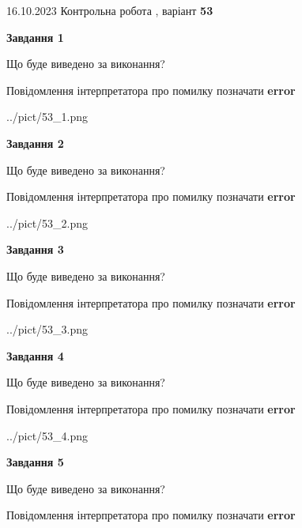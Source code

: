 \documentclass[12pt, ukrainian]{article}
\begin{document}
{\Large{16.10.2023 Контрольна робота , варіант  \No \textbf { 53 }\par}}
{
\begin {large}
{\begin {center}\textbf{Завдання 1}\end {center}}\par
Що буде виведено за виконання? \par
Повідомлення інтерпретатора про помилку позначати \textbf{error}

\begin{center}
	{../pict/53_1.png}
\end{center}
\newpage

{\begin {center}\textbf{Завдання 2}\end {center}}\par
Що буде виведено за виконання? \par
Повідомлення інтерпретатора про помилку позначати \textbf{error}

\begin{center}
	{../pict/53_2.png}
\end{center}
\newpage

{\begin {center}\textbf{Завдання 3}\end {center}}\par
Що буде виведено за виконання? \par
Повідомлення інтерпретатора про помилку позначати \textbf{error}

\begin{center}
	{../pict/53_3.png}
\end{center}
\newpage

{\begin {center}\textbf{Завдання 4}\end {center}}\par
Що буде виведено за виконання? \par
Повідомлення інтерпретатора про помилку позначати \textbf{error}

\begin{center}
	{../pict/53_4.png}
\end{center}
\newpage

{\begin {center}\textbf{Завдання 5}\end {center}}\par
Що буде виведено за виконання? \par
Повідомлення інтерпретатора про помилку позначати \textbf{error}


\end{large}}
\end{document}
